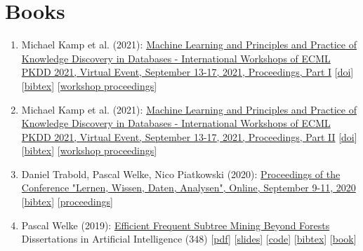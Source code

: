 \documentclass{scrartcl}
\begin{document}
\section{Books}
\begin{enumerate}
\conti
\item
\label{ecml2021workshop1}
Michael Kamp et al. (2021):\newline
\href{https://dx.doi.org/10.1007/978-3-030-93736-2}{Machine Learning and Principles and Practice of Knowledge Discovery
in Databases - International Workshops of ECML PKDD 2021, Virtual
Event, September 13-17, 2021, Proceedings, Part I}\newline
{\footnotesize
[\href{https://dx.doi.org/10.1007/978-3-030-93736-2}{doi}]
[\href{https://dblp.org/rec/conf/pkdd/2021-w1.bib}{bibtex}]
[\href{https://pwelke.github.io/}{workshop proceedings}]
}
\item
\label{ecml2021workshop2}
Michael Kamp et al. (2021):\newline
\href{https://dx.doi.org/10.1007/978-3-030-93733-1}{Machine Learning and Principles and Practice of Knowledge Discovery
in Databases - International Workshops of ECML PKDD 2021, Virtual
Event, September 13-17, 2021, Proceedings, Part II}\newline
{\footnotesize
[\href{https://dx.doi.org/10.1007/978-3-030-93733-1}{doi}]
[\href{https://dblp.org/rec/conf/pkdd/2021-w2.bib}{bibtex}]
[\href{https://pwelke.github.io/}{workshop proceedings}]
}
\item
\label{lwda2020proceedings}
Daniel Trabold, Pascal Welke, Nico Piatkowski (2020):\newline
\href{https://ceur-ws.org/Vol-2738}{Proceedings of the Conference "Lernen, Wissen, Daten, Analysen", Online,
September 9-11, 2020}\newline
{\footnotesize
[\href{https://dblp.org/rec/conf/lwa/2020.bib}{bibtex}]
[\href{https://ceur-ws.org/Vol-2738}{proceedings}]
}
\item
\label{welke2019diss}
Pascal Welke (2019):\newline
\href{https://hdl.handle.net/20.500.11811/7893}{Efficient Frequent Subtree Mining Beyond Forests}\newline
Dissertations in Artificial Intelligence (348)\newline
{\footnotesize
[\href{https://bonndoc.ulb.uni-bonn.de/xmlui/bitstream/handle/20.500.11811/7893/5401.pdf}{pdf}]
[\href{https://pwelke.github.io/publications/welke2019diss-slides.pdf}{slides}]
[\href{https://github.com/pwelke/GraphMiningTools}{code}]
[\href{https://dblp.org/rec/phd/dnb/Welke19.bib}{bibtex}]
[\href{https://www.iospress.nl/book/efficient-frequent-subtree-mining-beyond-forests/}{book}]
}
\seti
\end{enumerate}
\end{document}
